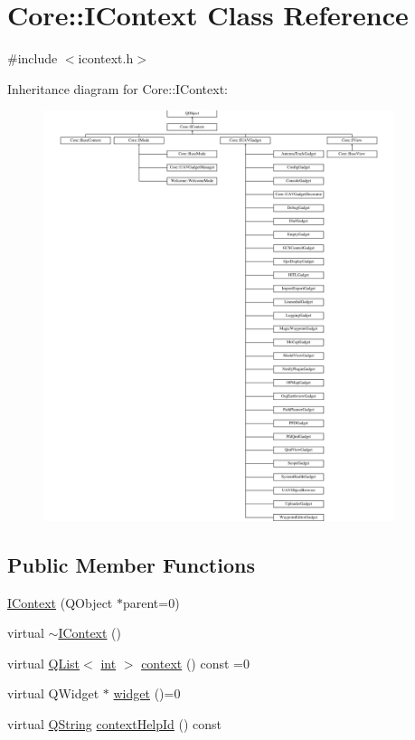 \hypertarget{class_core_1_1_i_context}{\section{Core\-:\-:I\-Context Class Reference}
\label{class_core_1_1_i_context}
}


{\ttfamily \#include $<$icontext.\-h$>$}

Inheritance diagram for Core\-:\-:I\-Context\-:\begin{figure}[H]
\begin{center}
\leavevmode
\includegraphics[height=12.000000cm]{class_core_1_1_i_context}
\end{center}
\end{figure}
\subsection*{Public Member Functions}
\begin{DoxyCompactItemize}
\item 
\hyperlink{group___core_plugin_gaefe1feaabd7322bdc75a29867232b62d}{I\-Context} (Q\-Object $\ast$parent=0)
\item 
virtual \hyperlink{group___core_plugin_ga06db5255221724686bbd8a6de4be036f}{$\sim$\-I\-Context} ()
\item 
virtual \hyperlink{class_q_list}{Q\-List}$<$ \hyperlink{ioapi_8h_a787fa3cf048117ba7123753c1e74fcd6}{int} $>$ \hyperlink{group___core_plugin_ga1256e28e719a9a981f779a0c77b59a7e}{context} () const =0
\item 
virtual Q\-Widget $\ast$ \hyperlink{group___core_plugin_gafa470639238652ef10e435b6c28d9282}{widget} ()=0
\item 
virtual \hyperlink{group___u_a_v_objects_plugin_gab9d252f49c333c94a72f97ce3105a32d}{Q\-String} \hyperlink{group___core_plugin_ga5997b2db2d4557802b5b8a8006790abf}{context\-Help\-Id} () const 
\end{DoxyCompactItemize}


